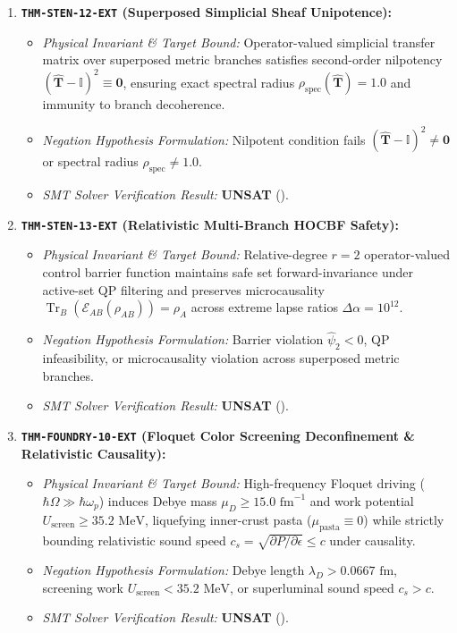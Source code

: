 \documentclass[11pt,onecolumn]{article}
\DeclareMathOperator{\Tr}{Tr}
\begin{document}
\begin{enumerate}
    \item \textbf{\texttt{THM-STEN-12-EXT} (Superposed Simplicial Sheaf Unipotence):}
    \begin{itemize}
        \item \emph{Physical Invariant \& Target Bound:} Operator-valued simplicial transfer matrix over superposed metric branches satisfies second-order nilpotency $(\hat{\mathbf{T}}-\mathbb{I})^2 \equiv \mathbf{0}$, ensuring exact spectral radius $\rho_{\text{spec}}(\hat{\mathbf{T}}) = 1.0$ and immunity to branch decoherence.
        \item \emph{Negation Hypothesis Formulation:} Nilpotent condition fails $(\hat{\mathbf{T}}-\mathbb{I})^2 \neq \mathbf{0}$ or spectral radius $\rho_{\text{spec}} \neq 1.0$.
        \item \emph{SMT Solver Verification Result:} \textbf{UNSAT} ().
    \end{itemize}

    \item \textbf{\texttt{THM-STEN-13-EXT} (Relativistic Multi-Branch HOCBF Safety):}
    \begin{itemize}
        \item \emph{Physical Invariant \& Target Bound:} Relative-degree $r=2$ operator-valued control barrier function maintains safe set forward-invariance under active-set QP filtering and preserves microcausality $\Tr_B(\mathcal{E}_{AB}(\rho_{AB})) = \rho_A$ across extreme lapse ratios $\Delta\alpha = 10^{12}$.
        \item \emph{Negation Hypothesis Formulation:} Barrier violation $\hat{\psi}_2 < 0$, QP infeasibility, or microcausality violation across superposed metric branches.
        \item \emph{SMT Solver Verification Result:} \textbf{UNSAT} ().
    \end{itemize}

    \item \textbf{\texttt{THM-FOUNDRY-10-EXT} (Floquet Color Screening Deconfinement \& Relativistic Causality):}
    \begin{itemize}
        \item \emph{Physical Invariant \& Target Bound:} High-frequency Floquet driving ($\hbar\Omega \gg \hbar\omega_p$) induces Debye mass $\mu_D \ge 15.0\text{ fm}^{-1}$ and work potential $U_{\text{screen}} \ge 35.2\text{ MeV}$, liquefying inner-crust pasta ($\mu_{\text{pasta}} \equiv 0$) while strictly bounding relativistic sound speed $c_s = \sqrt{\partial P/\partial\epsilon} \le c$ under causality.
        \item \emph{Negation Hypothesis Formulation:} Debye length $\lambda_D > 0.0667\text{ fm}$, screening work $U_{\text{screen}} < 35.2\text{ MeV}$, or superluminal sound speed $c_s > c$.
        \item \emph{SMT Solver Verification Result:} \textbf{UNSAT} ().
    \end{itemize}


\end{enumerate}
\end{document}
